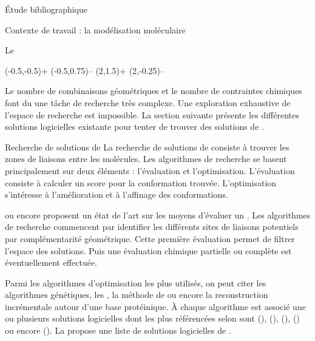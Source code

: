 \documentclass[myfrancais,ngerman,english,frenchb]{mythesis}
\begin{document}
\begin{mychapter}{Étude bibliographique}
\begin{mysection}{Contexte de travail : la modélisation moléculaire}
\begin{mysubsection}{Le }
\begin{myfigure}
\begin{mysubfigure}
\begin{myps}
							\mysign(-0.5,-0.5){+}
							\mysign(-0.5,0.75){--}
							\mysign(2,1.5){+}
							\mysign(2,-0.25){--}
						\end{myps}
					\end{mysubfigure}
				\end{myfigure}

				Le nombre de combinaisons géométriques et le nombre de contraintes chimiques font du  une tâche de recherche très complexe.
				Une exploration exhaustive de l'espace de recherche est impossible.
				La section suivante présente les différentes solutions logicielles existante pour tenter de trouver des solutions de .
			\end{mysubsection}
			\begin{mysubsection}{Recherche de solutions de }
				La recherche de solutions de  consiste à trouver les zones de liaisons entre les molécules.
				Les algorithmes de recherche se basent principalement sur deux éléments : l'évaluation et l'optimisation.
				L'évaluation consiste à calculer un score pour la conformation trouvée.
				L'optimisation s'intéresse à l'amélioration et à l'affinage des conformations.

				 ou encore  proposent un état de l'art sur les moyens d'évaluer un .
				Les algorithmes de recherche commencent par identifier les différents sites de liaisons potentiels par complémentarité géométrique.
				Cette première évaluation permet de filtrer l'espace des solutions.
				Puis une évaluation chimique partielle ou complète est éventuellement effectuée.

				Parmi les algorithmes d'optimisation les plus utilisés, on peut citer les algorithmes génétiques, les , la méthode de  ou encore la reconstruction incrémentale autour d'une base protéinique.
				À chaque algorithme est associé une ou plusieurs solutions logicielles dont les plus référencées selon  sont \myAutoDock (), \myGOLD (), \myFlexX (), \myDOCK () ou encore \myICMDocking ().
				La  propose une liste de solutions logicielles de .


\end{mysubsection}
\end{mysection}
\end{mychapter}
\end{document}
